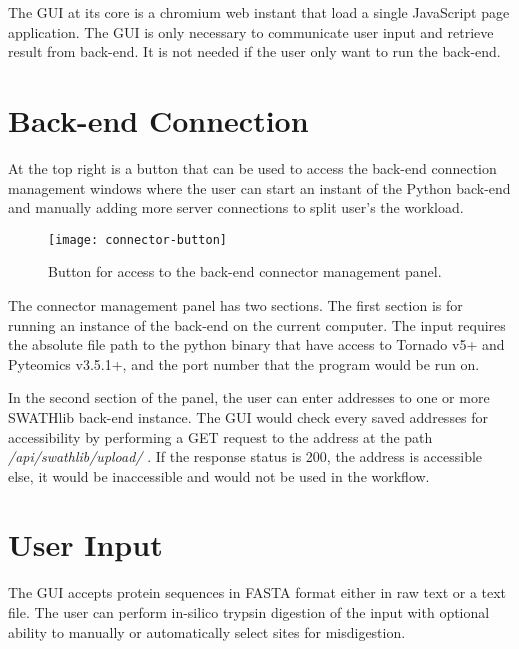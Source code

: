 \documentclass[../manual.tex]{subfiles}
\begin{document}
The GUI at its core is a chromium web instant that load a single JavaScript page application. The GUI is only necessary to communicate user input and retrieve result from back-end. It is not needed if the user only want to run the back-end.\par

\section{Back-end Connection}
At the top right is a button that can be used to access the back-end connection management windows where the user can start an instant of the Python back-end and manually adding more server connections to split user's the workload.\par

\begin{figure}[h]
	\centering
	\begin{framed}
		\centering
		\texttt{[image: connector-button]}
		\caption{Button for access to the back-end connector management panel.}\label{fig:connectorbutton}
	\end{framed}
\end{figure}

The connector management panel has two sections. The first section is for running an instance of the back-end on the current computer. The input requires the absolute file path to the python binary that have access to Tornado v5+ and Pyteomics v3.5.1+, and the port number that the program would be run on.\par

In the second section of the panel, the user can enter addresses to one or more SWATHlib back-end instance. The GUI would check every saved addresses for accessibility by performing a GET request to the address at the path \emph{/api/swathlib/upload/} . If the response status is 200, the address is accessible else, it would be inaccessible and would not be used in the workflow.\par 

\section{User Input}
The GUI accepts protein sequences in FASTA format either in raw text or a text file. The user can perform in-silico trypsin digestion of the input with optional ability to manually or automatically select sites for misdigestion.\par
\end{document}
